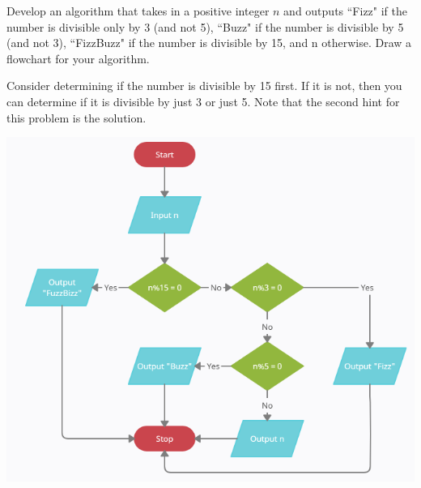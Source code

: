 \documentclass{ximera}
\begin{document}
\begin{question}
	Develop an algorithm that takes in a positive integer $n$ and outputs ``Fizz" if the number is divisible only by 3 (and not 5), ``Buzz" if the number is divisible by 5 (and not 3), ``FizzBuzz" if the number is divisible by 15, and n otherwise. Draw a flowchart for your algorithm.
	\begin{hint}
		Consider determining if the number is divisible by 15 first. If it is not, then you can determine if it is divisible by just 3 or just 5. Note that the second hint for this problem is the solution.
	\end{hint}
	\begin{hint}
		\begin{center}
			\includegraphics{fizzbuzz.png}
		\end{center}
	\end{hint}
\end{question}
\end{document}
